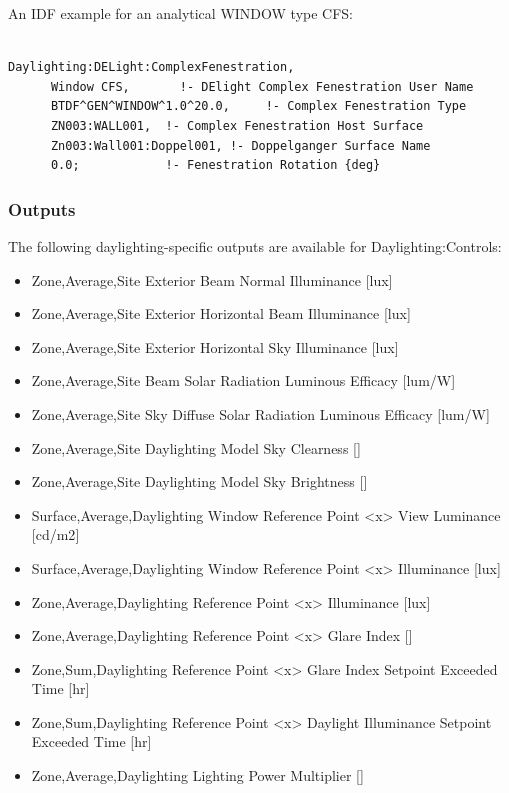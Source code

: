 An IDF example for an analytical WINDOW type CFS:

\begin{lstlisting}

Daylighting:DELight:ComplexFenestration,
      Window CFS,       !- DElight Complex Fenestration User Name
      BTDF^GEN^WINDOW^1.0^20.0,     !- Complex Fenestration Type
      ZN003:WALL001,  !- Complex Fenestration Host Surface
      Zn003:Wall001:Doppel001, !- Doppelganger Surface Name
      0.0;            !- Fenestration Rotation {deg}
\end{lstlisting}

\subsubsection{Outputs}\label{outputs-1-004}

The following daylighting-specific outputs are available for Daylighting:Controls:

\begin{itemize}
\item
  Zone,Average,Site Exterior Beam Normal Illuminance {[}lux{]}
\item
  Zone,Average,Site Exterior Horizontal Beam Illuminance {[}lux{]}
\item
  Zone,Average,Site Exterior Horizontal Sky Illuminance {[}lux{]}
\item
  Zone,Average,Site Beam Solar Radiation Luminous Efficacy {[}lum/W{]}
\item
  Zone,Average,Site Sky Diffuse Solar Radiation Luminous Efficacy {[}lum/W{]}
\item
  Zone,Average,Site Daylighting Model Sky Clearness {[]}
\item
  Zone,Average,Site Daylighting Model Sky Brightness {[]}
\item
  Surface,Average,Daylighting Window Reference Point <x> View Luminance {[}cd/m2{]}
\item
  Surface,Average,Daylighting Window Reference Point <x> Illuminance {[}lux{]}
\item
  Zone,Average,Daylighting Reference Point <x> Illuminance {[}lux{]}
\item
  Zone,Average,Daylighting Reference Point <x> Glare Index {[]}
\item
  Zone,Sum,Daylighting Reference Point <x> Glare Index Setpoint Exceeded Time {[}hr{]}
\item
  Zone,Sum,Daylighting Reference Point <x> Daylight Illuminance Setpoint Exceeded Time {[}hr{]}
\item
  Zone,Average,Daylighting Lighting Power Multiplier {[]}
\end{itemize}

